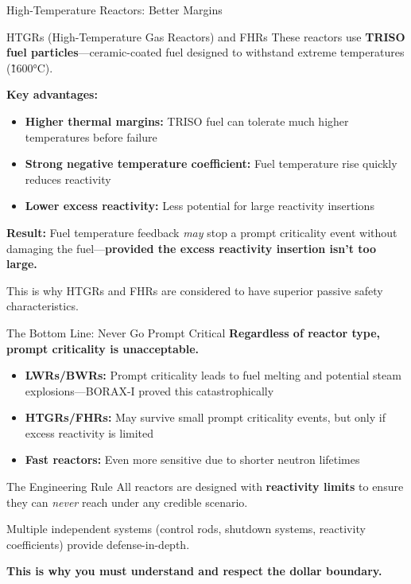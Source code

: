 \documentclass[aspectratio=169]{beamer}
\begin{document}
\begin{frame}[allowframebreaks]{High-Temperature Reactors: Better Margins}
    \begin{block}{HTGRs (High-Temperature Gas Reactors) and FHRs}
        These reactors use \textbf{TRISO fuel particles}—ceramic-coated fuel designed to withstand extreme temperatures (\~ 1600°C).
        
        \textbf{Key advantages:}
        \begin{itemize}
            \item \textbf{Higher thermal margins:} TRISO fuel can tolerate much higher temperatures before failure
            \item \textbf{Strong negative temperature coefficient:} Fuel temperature rise quickly reduces reactivity
            \item \textbf{Lower excess reactivity:} Less potential for large reactivity insertions
        \end{itemize}

        \textbf{Result:} Fuel temperature feedback \textit{may} stop a prompt criticality event without damaging the fuel—\textbf{provided the excess reactivity insertion isn't too large.}
    \end{block}

    This is why HTGRs and FHRs are considered to have superior passive safety characteristics.
\end{frame}

\begin{frame}[allowframebreaks]{The Bottom Line: Never Go Prompt Critical}
    \textbf{Regardless of reactor type, prompt criticality is unacceptable.}

    \vspace{1em}
    \begin{itemize}
        \item \textbf{LWRs/BWRs:} Prompt criticality leads to fuel melting and potential steam explosions—BORAX-I proved this catastrophically \cite{putman2012criticality}
        \item \textbf{HTGRs/FHRs:} May survive small prompt criticality events, but only if excess reactivity is limited
        \item \textbf{Fast reactors:} Even more sensitive due to shorter neutron lifetimes
    \end{itemize}

    \vspace{1em}
    \begin{alertblock}{The Engineering Rule}
        All reactors are designed with \textbf{reactivity limits} to ensure they can \textit{never} reach  under any credible scenario.
        
        Multiple independent systems (control rods, shutdown systems, reactivity coefficients) provide defense-in-depth.
    \end{alertblock}

    \textbf{This is why you must understand and respect the dollar boundary.}
\end{frame}
\end{document}
